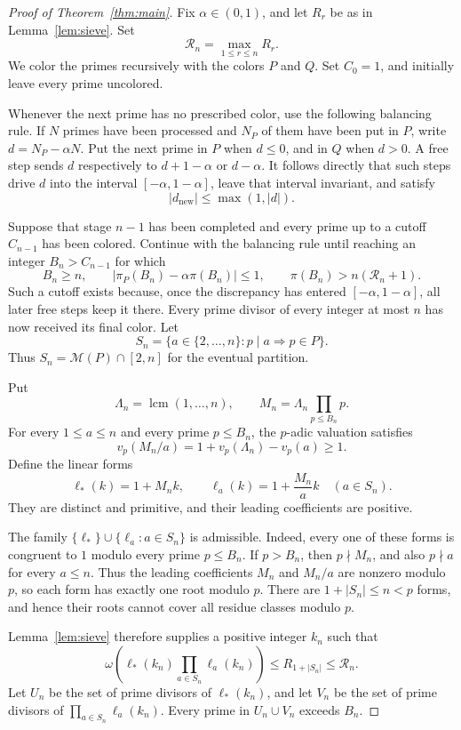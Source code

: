 \documentclass[a4paper,11pt]{amsart}
\DeclareMathOperator{\lcmop}{lcm}
\newcommand{\cM}{\mathcal M}
\begin{document}
\begin{proof}[Proof of Theorem~\ref{thm:main}]
Fix \(\alpha\in(0,1)\), and let \(R_r\) be as in Lemma~\ref{lem:sieve}.
Set
\[
\mathcal R_n=\max_{1\leq r\leq n}R_r.
\]
We color the primes recursively with the colors \(P\) and \(Q\).
Set \(C_0=1\), and initially leave every prime uncolored.

Whenever the next prime has no prescribed color, use the following balancing rule.
If \(N\) primes have been processed and \(N_P\) of them have been put in \(P\), write \(d=N_P-\alpha N\).
Put the next prime in \(P\) when \(d\leq0\), and in \(Q\) when \(d>0\).
A free step sends \(d\) respectively to \(d+1-\alpha\) or \(d-\alpha\).
It follows directly that such steps drive \(d\) into the interval
\([-\alpha,1-\alpha]\), leave that interval invariant, and satisfy
\[
|d_{\mathrm{new}}|\leq\max(1,|d|).
\]

Suppose that stage \(n-1\) has been completed and every prime up to a cutoff \(C_{n-1}\) has been colored.
Continue with the balancing rule until reaching an integer \(B_n>C_{n-1}\) for which
\[
B_n\geq n,\qquad
|\pi_P(B_n)-\alpha\pi(B_n)|\leq1,
\qquad
\pi(B_n)>n(\mathcal R_n+1).
\]
Such a cutoff exists because, once the discrepancy has entered
\([-\alpha,1-\alpha]\), all later free steps keep it there.
Every prime divisor of every integer at most \(n\) has now received its final color.
Let
\[
S_n=\{a\in\{2,\ldots,n\}:p\mid a\Longrightarrow p\in P\}.
\]
Thus \(S_n=\cM(P)\cap[2,n]\) for the eventual partition.

Put
\[
\Lambda_n=\lcmop(1,\ldots,n),
\qquad
M_n=\Lambda_n\prod_{p\leq B_n}p.
\]
For every \(1\leq a\leq n\) and every prime \(p\leq B_n\), the \(p\)-adic valuation satisfies
\[
v_p(M_n/a)=1+v_p(\Lambda_n)-v_p(a)\geq1.
\]
Define the linear forms
\[
\ell_*(k)=1+M_nk,
\qquad
\ell_a(k)=1+\frac{M_n}{a}k
\quad (a\in S_n).
\]
They are distinct and primitive, and their leading coefficients are positive.

The family
\(\{\ell_*\}\cup\{\ell_a:a\in S_n\}\) is admissible.
Indeed, every one of these forms is congruent to \(1\) modulo every prime \(p\leq B_n\).
If \(p>B_n\), then \(p\nmid M_n\), and also \(p\nmid a\) for every
\(a\leq n\).  Thus the leading coefficients \(M_n\) and \(M_n/a\)
are nonzero modulo \(p\), so each form has exactly one root modulo \(p\).
There are \(1+|S_n|\leq n<p\) forms, and hence their roots cannot cover all residue classes modulo \(p\).

Lemma~\ref{lem:sieve} therefore supplies a positive integer \(k_n\) such that
\[
\omega\!\left(
\ell_*(k_n)\prod_{a\in S_n}\ell_a(k_n)
\right)
\leq R_{1+|S_n|}
\leq\mathcal R_n.
\]
Let \(U_n\) be the set of prime divisors of \(\ell_*(k_n)\), and let \(V_n\) be the set of prime divisors of
\(\prod_{a\in S_n}\ell_a(k_n)\).
Every prime in \(U_n\cup V_n\) exceeds \(B_n\).


\end{proof}
\end{document}

